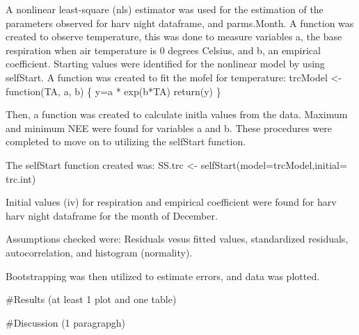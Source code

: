 \documentclass[
]{article}
\begin{document}
A nonlinear least-square (nls) estimator was used for the estimation of
the parameters observed for harv night dataframe, and parms.Month. A
function was created to observe temperature, this was done to measure
variables a, the base respiration when air temperature is 0 degrees
Celsius, and b, an empirical coefficient. Starting values were
identified for the nonlinear model by using selfStart. A function was
created to fit the mofel for temperature: trcModel \textless-
function(TA, a, b) \{ y=a * exp(b*TA) return(y) \}

Then, a function was created to calculate initla values from the data.
Maximum and minimum NEE were found for variables a and b. These
procedures were completed to move on to utilizing the selfStart
function.

The selfStart function created was: SS.trc \textless-
selfStart(model=trcModel,initial= trc.int)

Initial values (iv) for respiration and empirical coefficient were found
for harv harv night dataframe for the month of December.

Assumptions checked were: Residuals vesus fitted values, standardized
residuals, autocorrelation, and histogram (normality).

Bootstrapping was then utilized to estimate errors, and data was
plotted.

\#Results (at least 1 plot and one table)

\#Discussion (1 paragrapgh)
\end{document}
